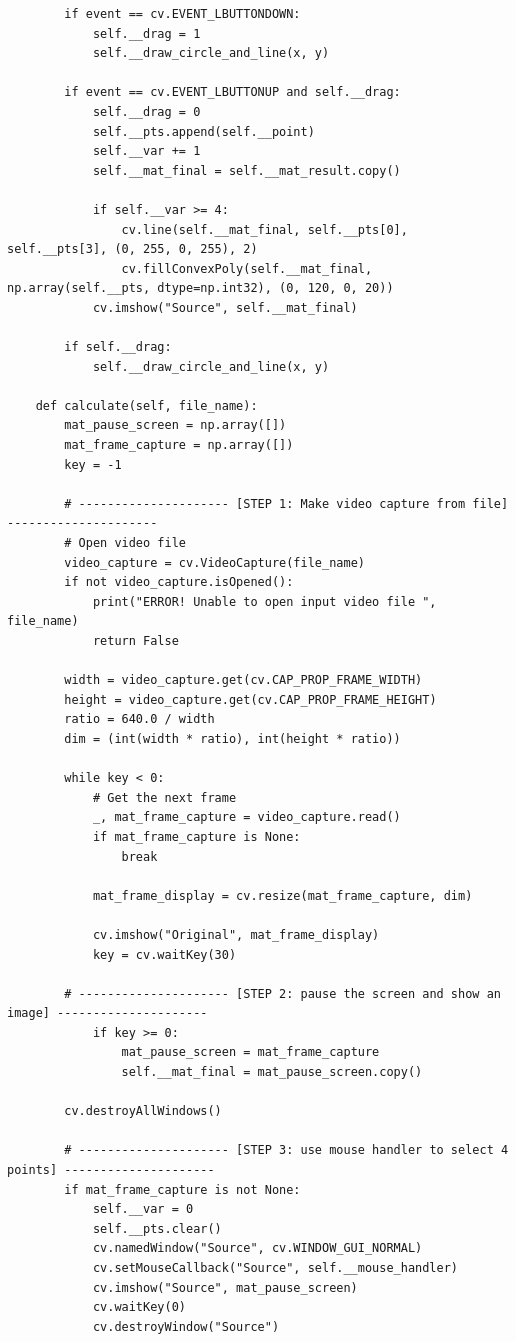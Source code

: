 \documentclass[a4paper, 12pt]{article}
\begin{document}
\begin{lstlisting}
        if event == cv.EVENT_LBUTTONDOWN:
            self.__drag = 1
            self.__draw_circle_and_line(x, y)

        if event == cv.EVENT_LBUTTONUP and self.__drag:
            self.__drag = 0
            self.__pts.append(self.__point)
            self.__var += 1
            self.__mat_final = self.__mat_result.copy()

            if self.__var >= 4:
                cv.line(self.__mat_final, self.__pts[0], self.__pts[3], (0, 255, 0, 255), 2)
                cv.fillConvexPoly(self.__mat_final, np.array(self.__pts, dtype=np.int32), (0, 120, 0, 20))
            cv.imshow("Source", self.__mat_final)

        if self.__drag:
            self.__draw_circle_and_line(x, y)

    def calculate(self, file_name):
        mat_pause_screen = np.array([])
        mat_frame_capture = np.array([])
        key = -1

        # --------------------- [STEP 1: Make video capture from file] ---------------------
        # Open video file
        video_capture = cv.VideoCapture(file_name)
        if not video_capture.isOpened():
            print("ERROR! Unable to open input video file ", file_name)
            return False

        width = video_capture.get(cv.CAP_PROP_FRAME_WIDTH)
        height = video_capture.get(cv.CAP_PROP_FRAME_HEIGHT)
        ratio = 640.0 / width
        dim = (int(width * ratio), int(height * ratio))

        while key < 0:
            # Get the next frame
            _, mat_frame_capture = video_capture.read()
            if mat_frame_capture is None:
                break

            mat_frame_display = cv.resize(mat_frame_capture, dim)

            cv.imshow("Original", mat_frame_display)
            key = cv.waitKey(30)

        # --------------------- [STEP 2: pause the screen and show an image] ---------------------
            if key >= 0:
                mat_pause_screen = mat_frame_capture
                self.__mat_final = mat_pause_screen.copy()

        cv.destroyAllWindows()

        # --------------------- [STEP 3: use mouse handler to select 4 points] ---------------------
        if mat_frame_capture is not None:
            self.__var = 0
            self.__pts.clear()
            cv.namedWindow("Source", cv.WINDOW_GUI_NORMAL)
            cv.setMouseCallback("Source", self.__mouse_handler)
            cv.imshow("Source", mat_pause_screen)
            cv.waitKey(0)
            cv.destroyWindow("Source")


\end{lstlisting}
\end{document}
